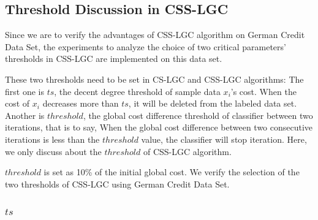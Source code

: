 \documentclass{svjour3}                     %
\begin{document}
\subsection{Threshold Discussion in CSS-LGC}
Since we are to verify the advantages of CSS-LGC algorithm on German Credit Data Set, the experiments to analyze the choice of two critical parameters' thresholds in CSS-LGC are implemented on this data set.

These two thresholds need to be set in CS-LGC and CSS-LGC algorithms: The first one is $ts$, the decent degree threshold of sample data $x_i$'s cost. When the cost of $x_i$ decreases more than $ts$, it will be deleted from the labeled data set. Another is $threshold$, the global cost difference threshold of classifier between two iterations, that is to say, When the global cost difference between two consecutive iterations is less than the $threshold$ value, the classifier will stop iteration. Here, we only discuss about the $threshold$ of CSS-LGC algorithm.

$threshold$ is set as 10\% of the initial global cost. We verify the selection of the two thresholds of CSS-LGC using German Credit Data Set.

\subsubsection{$ts$}
\end{document}
